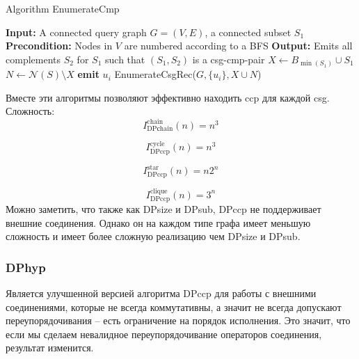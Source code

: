 \documentclass[12pt]{article}
\begin{document}
\begin{flushleft}
\begin{algorithm}
    Algorithm EnumerateCmp
    \begin{algorithmic}[1]
        \State \textbf{Input:} A connected query graph $G = (V, E)$, a connected subset $S_1$
        \State \textbf{Precondition:} Nodes in $V$ are numbered according to a BFS
        \State \textbf{Output:} Emits all complements $S_2$ for $S_1$ such that $(S_1, S_2)$ is a csg-cmp-pair
        \State $X \gets B_{\min(S_1)} \cup S_1$
        \State $N \gets \mathcal{N}(S) \setminus X$
            \State \textbf{emit} $u_i$
            \State EnumerateCsgRec($G, \{u_i\}, X \cup N$)
        \EndFor
    \end{algorithmic}
\end{algorithm}

Вместе эти алгоритмы позволяют эффективно находить ccp для каждой csg.
Сложность:
\[
I^{\text{chain}}_{\text{DPсhain}}(n) =
n^3
\]

\[
I^{\text{cycle}}_{\text{DPccp}}(n) =
n^3
\]

\[
I^{\text{star}}_{\text{DPccp}}(n) =
n2^n
\]

\[
I^{\text{clique}}_{\text{DPccp}}(n) =
3^n
\]
Можно заметить, что также как DPsize и DPsub, DPccp не поддерживает внешние соединения.
Однако он на каждом типе графа имеет меньшую сложность и имеет более сложную
реализацию чем DPsize и DPsub.

\centering \subsubsection*{DPhyp \cite{MoeNeu}}
\raggedright

Является улучшенной версией алгоритма DPccp для работы
с внешними соединениями, которые не всегда коммутативны, а значит 
не всегда допускают переупорядочивания -- есть ограничение на порядок исполнения. Это значит, что если
мы сделаем невалидное переупорядочивание операторов соединения, результат изменится.

\begin{center}
\end{center}
\end{flushleft}
\end{document}
